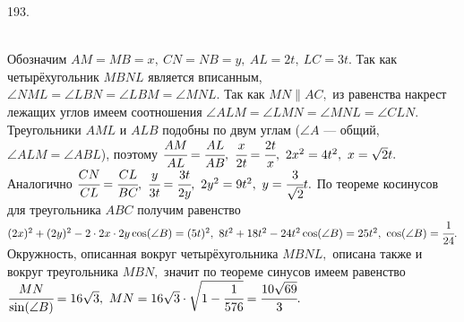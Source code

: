 193. \begin{figure}[ht!]
\end{figure}\\
Обозначим $AM=MB=x,\ CN=NB=y,\ AL=2t,\ LC=3t.$ Так как четырёхугольник $MBNL$ является вписанным, $\angle NML=\angle LBN=\angle LBM=\angle MNL.$ Так как $MN\parallel AC,$ из равенства накрест лежащих углов имеем соотношения $\angle ALM=\angle LMN=\angle MNL=\angle CLN.$ Треугольники $AML$ и $ALB$ подобны по двум углам ($\angle A$ --- общий, $\angle ALM=\angle ABL$), поэтому $\cfrac{AM}{AL}=\cfrac{AL}{AB},\ \cfrac{x}{2t}=\cfrac{2t}{x},\ 2x^2=4t^2,\ x=\sqrt{2}t.$ Аналогично $\cfrac{CN}{CL}=\cfrac{CL}{BC},\ \cfrac{y}{3t}=\cfrac{3t}{2y},\ 2y^2=9t^2,\ y=\cfrac{3}{\sqrt{2}}t.$ По теореме косинусов для треугольника $ABC$ получим равенство $(2x)^2+(2y)^2-2\cdot2x\cdot2y\cos(\angle B)=(5t)^2,\
8t^2+18t^2-24t^2\cos(\angle B)=25t^2,\ \cos(\angle B)=\cfrac{1}{24}.$ Окружность, описанная вокруг четырёхугольника $MBNL,$ описана также и вокруг треугольника $MBN,$ значит по теореме синусов имеем равенство $\cfrac{MN}{\sin(\angle B)}=16\sqrt{3},\ MN=16\sqrt{3}\cdot\sqrt{1-\cfrac{1}{576}}=\cfrac{10\sqrt{69}}{3}.$\\
